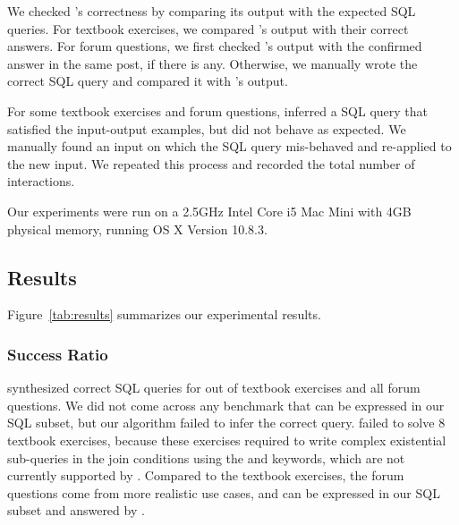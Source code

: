 We checked \ourtool's correctness by comparing its
output with the expected SQL queries.
For textbook exercises, we compared \ourtool's output with
their correct answers. For forum questions, we first
checked \ourtool's output with the confirmed answer
in the same post, if there is any. Otherwise, we
manually wrote the correct SQL query and
compared it with \ourtool's output.

For some textbook exercises and forum questions,
\ourtool inferred a SQL query that satisfied the input-output
examples, but did not behave as expected.
We manually found an input on which the
SQL query mis-behaved and re-applied \ourtool to the new input. We
repeated this process and recorded the total number of
interactions.


Our experiments were run on a 2.5GHz Intel Core i5 Mac Mini
with 4GB physical memory, running OS X Version 10.8.3.





\vspace{-2mm}
\subsection{Results}
\vspace{-1mm}

Figure~\ref{tab:results} summarizes our experimental results.

\subsubsection{Success Ratio}
\label{sec:ratio}


\ourtool synthesized correct SQL queries for \solexnum  out of
\exnum textbook exercises and 
all \pnum forum questions.
We did not come across any benchmark
that can be expressed in our SQL subset,
but our algorithm failed to infer the correct query.
\ourtool failed to solve 8 textbook exercises,
because these exercises required to write
complex existential sub-queries in the join conditions
using the  and  keywords,
which are not currently supported by \ourtool.
Compared to the textbook exercises, the \pnum
forum questions come from more realistic use cases,
and can be expressed in our SQL subset
and answered by \ourtool.



